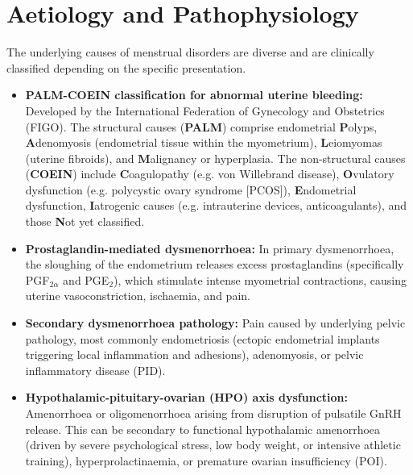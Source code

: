 \section*{Aetiology and Pathophysiology}
The underlying causes of menstrual disorders are diverse and are clinically classified depending on the specific presentation.
\begin{itemize}
    \item \textbf{PALM-COEIN classification for abnormal uterine bleeding:} Developed by the International Federation of Gynecology and Obstetrics (FIGO). The structural causes (\textbf{PALM}) comprise endometrial \textbf{P}olyps, \textbf{A}denomyosis (endometrial tissue within the myometrium), \textbf{L}eiomyomas (uterine fibroids), and \textbf{M}alignancy or hyperplasia. The non-structural causes (\textbf{COEIN}) include \textbf{C}oagulopathy (e.g. von Willebrand disease), \textbf{O}vulatory dysfunction (e.g. polycystic ovary syndrome [PCOS]), \textbf{E}ndometrial dysfunction, \textbf{I}atrogenic causes (e.g. intrauterine devices, anticoagulants), and those \textbf{N}ot yet classified.
    \item \textbf{Prostaglandin-mediated dysmenorrhoea:} In primary dysmenorrhoea, the sloughing of the endometrium releases excess prostaglandins (specifically PGF$_{2\alpha}$ and PGE$_2$), which stimulate intense myometrial contractions, causing uterine vasoconstriction, ischaemia, and pain.
    \item \textbf{Secondary dysmenorrhoea pathology:} Pain caused by underlying pelvic pathology, most commonly endometriosis (ectopic endometrial implants triggering local inflammation and adhesions), adenomyosis, or pelvic inflammatory disease (PID).
    \item \textbf{Hypothalamic-pituitary-ovarian (HPO) axis dysfunction:} Amenorrhoea or oligomenorrhoea arising from disruption of pulsatile GnRH release. This can be secondary to functional hypothalamic amenorrhoea (driven by severe psychological stress, low body weight, or intensive athletic training), hyperprolactinaemia, or premature ovarian insufficiency (POI).
\end{itemize}

